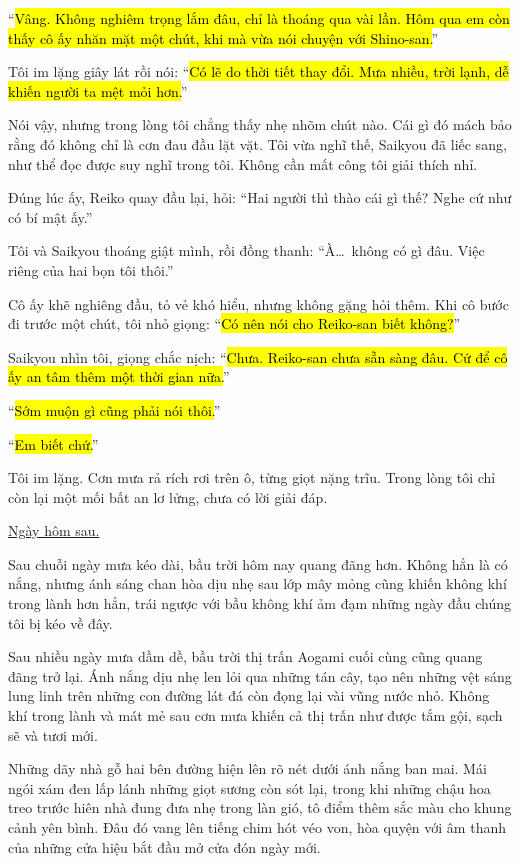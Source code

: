 \documentclass[../main.tex]{subfiles}
\begin{document}
``\hl{Vâng. Không nghiêm trọng lắm đâu, chỉ là thoáng qua vài lần. Hôm qua em còn thấy cô ấy nhăn mặt một chút, khi mà vừa nói chuyện với Shino-san.}''

Tôi im lặng giây lát rồi nói: ``\hl{Có lẽ do thời tiết thay đổi. Mưa nhiều, trời lạnh, dễ khiến người ta mệt mỏi hơn.}''

Nói vậy, nhưng trong lòng tôi chẳng thấy nhẹ nhõm chút nào. Cái gì đó mách bảo rằng đó không chỉ là cơn đau đầu lặt vặt. Tôi vừa nghĩ thế, Saikyou đã liếc sang, như thể đọc được suy nghĩ trong tôi. Không cần mất công tôi giải thích nhỉ.

Đúng lúc ấy, Reiko quay đầu lại, hỏi: ``Hai người thì thào cái gì thế? Nghe cứ như có bí mật ấy.''

Tôi và Saikyou thoáng giật mình, rồi đồng thanh: ``À\dots\ không có gì đâu. Việc riêng của hai bọn tôi thôi.''

Cô ấy khẽ nghiêng đầu, tỏ vẻ khó hiểu, nhưng không gặng hỏi thêm. Khi cô bước đi trước một chút, tôi nhỏ giọng: ``\hl{Có nên nói cho Reiko-san biết không?}''

Saikyou nhìn tôi, giọng chắc nịch: ``\hl{Chưa. Reiko-san chưa sẵn sàng đâu. Cứ để cô ấy an tâm thêm một thời gian nữa.}''

``\hl{Sớm muộn gì cũng phải nói thôi.}''

``\hl{Em biết chứ.}''

Tôi im lặng. Cơn mưa rả rích rơi trên ô, từng giọt nặng trĩu. Trong lòng tôi chỉ còn lại một mối bất an lơ lửng, chưa có lời giải đáp.

\begin{center}
  \uline{Ngày hôm sau.}
\end{center}

Sau chuỗi ngày mưa kéo dài, bầu trời hôm nay quang đãng hơn. Không hẳn là có nắng, nhưng ánh sáng chan hòa dịu nhẹ sau lớp mây mỏng cũng khiến không khí trong lành hơn hẳn, trái ngược với bầu không khí ảm đạm những ngày đầu chúng tôi bị kéo về đây.

Sau nhiều ngày mưa dầm dề, bầu trời thị trấn Aogami cuối cùng cũng quang đãng trở lại. Ánh nắng dịu nhẹ len lỏi qua những tán cây, tạo nên những vệt sáng lung linh trên những con đường lát đá còn đọng lại vài vũng nước nhỏ. Không khí trong lành và mát mẻ sau cơn mưa khiến cả thị trấn như được tắm gội, sạch sẽ và tươi mới.

Những dãy nhà gỗ hai bên đường hiện lên rõ nét dưới ánh nắng ban mai. Mái ngói xám đen lấp lánh những giọt sương còn sót lại, trong khi những chậu hoa treo trước hiên nhà đung đưa nhẹ trong làn gió, tô điểm thêm sắc màu cho khung cảnh yên bình. Đâu đó vang lên tiếng chim hót véo von, hòa quyện với âm thanh của những cửa hiệu bắt đầu mở cửa đón ngày mới.
\end{document}
